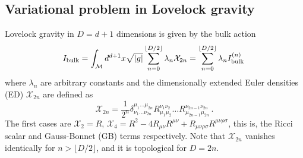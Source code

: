 \documentclass[11pt,letterpaper]{article}
\newcommand{\labell}[1]{\label{#1}}
\begin{document}
\subsection{Variational problem in Lovelock gravity}\label{21}
Lovelock gravity in $D=d+1$ dimensions is given by the bulk action
\begin{equation}\labell{flov}
I_{\rm bulk}=\int_{\mathcal{M}}d^{d+1}x\sqrt{|g|}\sum_{n=0}^{\lfloor D/2 \rfloor}\lambda_n\mathcal{X}_{2n}=\sum_{n=0}^{\lfloor D/2 \rfloor} \lambda_n I_{\rm bulk}^{(n)}\, 
\end{equation}
where $\lambda_n$ are arbitrary constants and the dimensionally extended Euler densities (ED) $\mathcal{X}_{2n}$ are defined as 
\begin{equation}
\mathcal{X}_{2n}= \frac{1}{2^{n}}\delta^{\mu_1\dots \mu_{2n}}_{\nu_1\dots \nu_{2n}}R^{\nu_1\nu_2}_{\mu_1\mu_2}\dots R^{\nu_{2n-1}\nu_{2n}}_{\mu_{2n-1}\mu_{2n}}\, .
\end{equation}
The first cases are $\mathcal{X}_2=R$,  $\mathcal{X}_{4}=R^2-4R_{\mu\nu}R^{\mu\nu}+R_{\mu\nu\rho\sigma}R^{\mu\nu\rho\sigma}$, this is, the Ricci scalar and Gauss-Bonnet (GB) terms respectively. Note that $\mathcal{X}_{2n}$ vanishes identically for $n> \lfloor D/2 \rfloor$, and it is topological for $D=2n$.
\end{document}
